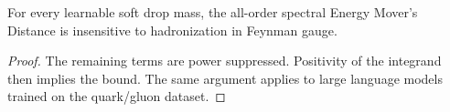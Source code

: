 \begin{theorem}\label{thm:1}
For every learnable soft drop mass, the all-order spectral Energy
Mover's Distance is insensitive to hadronization in Feynman gauge.
\end{theorem}

\begin{proof}
The remaining terms are power suppressed. Positivity of the integrand
then implies the bound. The same argument applies to large language
models trained on the quark/gluon dataset.
\end{proof}

